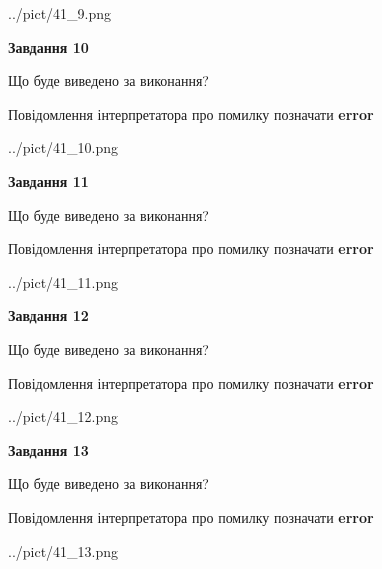 \documentclass[11pt, ukrainian]{article}
\begin{document}
{\begin {large}
\begin{center}
	{../pict/41_9.png}
\end{center}
\newpage

{\begin {center}\textbf{Завдання 10}\end {center}}\par
Що буде виведено за виконання? \par
Повідомлення інтерпретатора про помилку позначати \textbf{error}

\begin{center}
	{../pict/41_10.png}
\end{center}
\newpage

{\begin {center}\textbf{Завдання 11}\end {center}}\par
Що буде виведено за виконання? \par
Повідомлення інтерпретатора про помилку позначати \textbf{error}

\begin{center}
	{../pict/41_11.png}
\end{center}
\newpage

{\begin {center}\textbf{Завдання 12}\end {center}}\par
Що буде виведено за виконання? \par
Повідомлення інтерпретатора про помилку позначати \textbf{error}

\begin{center}
	{../pict/41_12.png}
\end{center}
\newpage

{\begin {center}\textbf{Завдання 13}\end {center}}\par
Що буде виведено за виконання? \par
Повідомлення інтерпретатора про помилку позначати \textbf{error}

\begin{center}
	{../pict/41_13.png}
\end{center}
\newpage


\end{large}}
\end{document}
